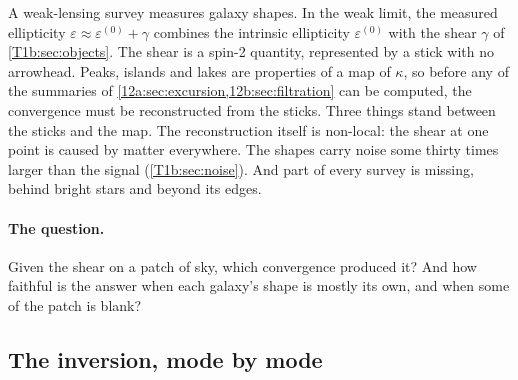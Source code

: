 A weak-lensing survey measures galaxy shapes. In the weak limit, the measured
ellipticity $\varepsilon\approx\varepsilon^{(0)}+\gamma$ combines the intrinsic
ellipticity $\varepsilon^{(0)}$ with the shear $\gamma$ of \cref{T1b:sec:objects}.
The shear is a spin-2 quantity, represented by a stick with no arrowhead. Peaks, islands and lakes are properties of a map
of $\kappa$, so before any of the summaries of \cref{12a:sec:excursion,12b:sec:filtration} can be computed, the
convergence must be reconstructed from the sticks. Three things stand between the sticks and the map. The
reconstruction itself is non-local: the shear at one point is caused by matter everywhere. The shapes carry noise
some thirty times larger than the signal (\cref{T1b:sec:noise}). And part of every survey is missing, behind bright
stars and beyond its edges.

\paragraph{The question.} Given the shear on a patch of sky, which convergence produced it? And how faithful is the
answer when each galaxy's shape is mostly its own, and when some of the patch is blank?

\subsection{The inversion, mode by mode}
\label{12w:sec:ks-chain}

